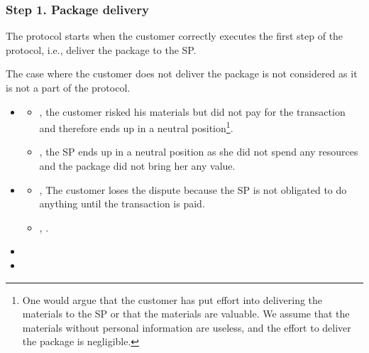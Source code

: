 \newcommand{\CustomerLosesBeforePayment}{The customer loses the dispute because the SP is not obligated to do anything until the transaction is paid}
\newcommand{\CustomerLosesBeforePoP}{The customer loses the dispute because the SP still can publish the PoP within the agreed timeframe}


\newcommand{\RemainsIn}[2]{The #1 remains in the #2 position}

\subsubsection*{Step 1. \CustomerTurn{} Package delivery}\label{step-1-deliver-package}

The protocol starts when the customer correctly executes the first step of the protocol, i.e., deliver the package to the SP. 

The case where the customer does not deliver the package is not considered as it is not a part of the protocol.

\begin{itemize}
\item \AgreeablePath
  \begin{itemize}
    \item  {}, the customer risked his materials but did not pay for the transaction and therefore ends up in a neutral position\footnote{One would argue that the customer has put effort into delivering the materials to the SP or that the materials are valuable. We assume that the materials without personal information are useless, and the effort to deliver the package is negligible.}.
    \item {}, the SP ends up in a neutral position as she did not spend any resources and the package did not bring her any value.
  \end{itemize}
\item \DisputePath
  \begin{itemize}
    \item {}, \CustomerLosesBeforePayment{}.
    \item {}, .
  \end{itemize}
\end{itemize}

\Fairness

\begin{itemize}
  \item {}
  \item {}
\end{itemize}

